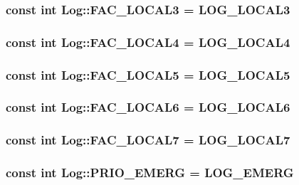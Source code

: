 \subsubsection{\setlength{\rightskip}{0pt plus 5cm}const int {\bf Log::FAC\_\-LOCAL3} = LOG\_\-LOCAL3\hspace{0.3cm}{\tt  [static]}}\label{classLog_467961bf9b0b73dd863a29e29642ed62}


\subsubsection{\setlength{\rightskip}{0pt plus 5cm}const int {\bf Log::FAC\_\-LOCAL4} = LOG\_\-LOCAL4\hspace{0.3cm}{\tt  [static]}}\label{classLog_2dfec8266dc4bfd9f4a37a6a6a193724}


\subsubsection{\setlength{\rightskip}{0pt plus 5cm}const int {\bf Log::FAC\_\-LOCAL5} = LOG\_\-LOCAL5\hspace{0.3cm}{\tt  [static]}}\label{classLog_8c8f287b845408f62e9971869764193d}


\subsubsection{\setlength{\rightskip}{0pt plus 5cm}const int {\bf Log::FAC\_\-LOCAL6} = LOG\_\-LOCAL6\hspace{0.3cm}{\tt  [static]}}\label{classLog_c7c45c9e1daa96ecb60ff12064a3dc6e}


\subsubsection{\setlength{\rightskip}{0pt plus 5cm}const int {\bf Log::FAC\_\-LOCAL7} = LOG\_\-LOCAL7\hspace{0.3cm}{\tt  [static]}}\label{classLog_886a44fb4cec033f0f7c028f530fe97c}


\subsubsection{\setlength{\rightskip}{0pt plus 5cm}const int {\bf Log::PRIO\_\-EMERG} = LOG\_\-EMERG\hspace{0.3cm}{\tt  [static]}}\label{classLog_3b068a7b9c9a7bd3a42d519daea16564}


